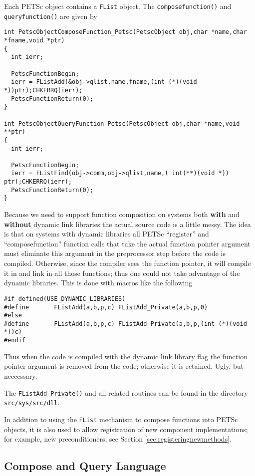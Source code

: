 \documentclass[twoside,12pt]{../sty/report_petsc}
\begin{document}
Each PETSc object contains a {\tt FList} object. The {\tt composefunction()} and 
{\tt queryfunction()} are given by 

\begin{verbatim}
int PetscObjectComposeFunction_Petsc(PetscObject obj,char *name,char *fname,void *ptr)
{
  int ierr;

  PetscFunctionBegin;
  ierr = FListAdd(&obj->qlist,name,fname,(int (*)(void *))ptr);CHKERRQ(ierr);
  PetscFunctionReturn(0);
}

int PetscObjectQueryFunction_Petsc(PetscObject obj,char *name,void **ptr)
{
  int ierr;

  PetscFunctionBegin;
  ierr = FListFind(obj->comm,obj->qlist,name,( int(**)(void *)) ptr);CHKERRQ(ierr);
  PetscFunctionReturn(0);
}
\end{verbatim}

  Because we need to support function composition on systems both {\bf with} and {\bf without} 
dynamic link libraries the actual source code is a little messy. The idea is that
on systems with dynamic libraries all PETSc ``register'' and ``composefunction''
function calls that take the actual 
function pointer argument must eliminate this argument in the preprocessor step before 
the code is compiled. Otherwise, since the compiler sees the function pointer, it will 
compile it in and link in all those functions; thus one could not take advantage of the
dynamic libraries. This is done with macros like the following
\begin{verbatim}
#if defined(USE_DYNAMIC_LIBRARIES)
#define       FListAdd(a,b,p,c) FListAdd_Private(a,b,p,0)
#else
#define       FListAdd(a,b,p,c) FListAdd_Private(a,b,p,(int (*)(void *))c)
#endif
\end{verbatim}
Thus when the code is compiled with the dynamic link library flag the function pointer 
argument is removed from the code; otherwise it is retained. Ugly, but neccessary.

The {\tt FListAdd\_Private()} and all related routines can be found in the directory
{\tt src/sys/src/dll}.

In addition to using the {\tt FList} mechanism to compose functions into PETSc objects, it is
also used to allow registration of new component implementations; for example, new
preconditioners, see Section \ref{sec:registeringnewmethods}. 

\subsection{Compose and Query Language}
\end{document}
